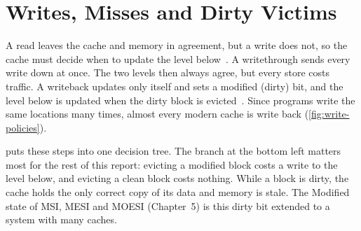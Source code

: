 \section{Writes, Misses and Dirty Victims}
\label{sec:cache-write}
\label{sec:cache-access}
\label{sec:cache-replacement}
%

A read leaves the cache and memory in agreement, but a write does not, so the
cache must decide when to update the level below~\cite[\S11.2.3]{sarangi2025basic}.
A \gls{writethrough} sends every write down at once. The two levels then always
agree, but every store costs traffic. A \gls{writeback}
updates only itself and sets a modified (dirty) bit, and the level below is
updated when the dirty block is evicted~\cite[\S11.2.6]{sarangi2025basic}. Since
programs write the same locations many times, almost every modern cache is write
back (\cref{fig:write-policies}).

 puts these steps into one decision tree. The branch at the
bottom left matters most for the rest of this report: evicting a modified block
costs a write to the level below, and evicting a clean block costs nothing. While
a block is dirty, the cache holds the only correct copy of its data and memory is
stale. The Modified state of MSI, MESI and MOESI (Chapter~5) is this dirty bit
extended to a system with many caches.

